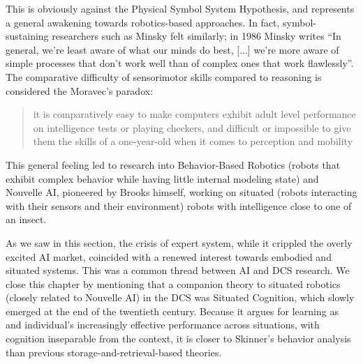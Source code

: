 \documentclass[../main.tex]{subfiles}
\begin{document}
This is obviously against the Physical Symbol System Hypothesis, and represents a general awakening towards robotics-based approaches. In fact, symbol-sustaining researchers such as Minsky felt similarly; in 1986 Minsky writes \enquote{In general, we're least aware of what our minds do best, [...] we're more aware of simple processes that don't work well than of complex ones that work flawlessly}\cite{minskySocietyMind1986}. The comparative difficulty of sensorimotor skills compared to reasoning is considered the Moravec's paradox:
\begin{quote}
    it is comparatively easy to make computers exhibit adult level performance on intelligence tests or playing checkers, and difficult or impossible to give them the skills of a one-year-old when it comes to perception and mobility
\end{quote}\cite{moravecMindChildrenFuture1988}
This general feeling led to research into Behavior-Based Robotics (robots that exhibit complex behavior while having little internal modeling state) and Nouvelle AI, pioneered by Brooks himself, working on situated (robots interacting with their sensors and their environment) robots with intelligence close to one of an insect.

\vspace{5pt}
As we saw in this section, the crisis of expert system, while it crippled the overly excited AI market, coincided with a renewed interest towards embodied and situated systems. This was a common thread between AI and DCS research. We close this chapter by mentioning that a companion theory to situated robotics (closely related to Nouvelle AI) in the DCS was Situated Cognition, which slowly emerged at the end of the twentieth century. Because it argues for learning as and individual's increasingly effective performance across situations, with cognition inseparable from the context, it is closer to Skinner's behavior analysis than previous storage-and-retrieval-based theories.
\end{document}
